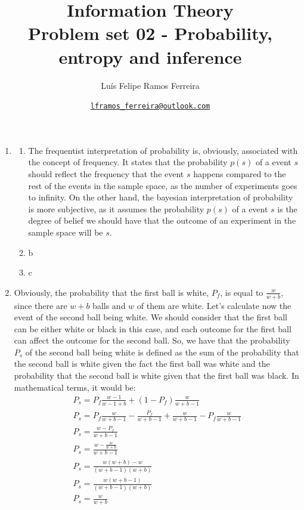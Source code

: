 \documentclass{article}
\title{Information Theory \\ \large Problem set 02 - Probability, entropy and inference}
\author{Luís Felipe Ramos Ferreira}
\date{\href{mailto:lframos\_ferreira@outlook.com}{\texttt{lframos\_ferreira@outlook.com}}
}
\begin{document}
\maketitle

\begin{enumerate}
    \item \begin{enumerate}
            \item The frequentist interpretation of probability is, obviously, associated with the concept of frequency. It states that the probability \(p(s)\) of a event \(s\) should reflect the frequency that the event \(s\) happens compared to the rest of the events in the sample space, as the number of experiments goes to infinity. On the other hand, the bayesian interpretation of probability is more subjective, as it assumes the probability \(p(s)\) of a event \(s\) is the degree of belief we should have that the outcome of an experiment in the sample space will be \(s\).
            \item b
            \item c
    \end{enumerate}

    \item Obviously, the probability that the first ball is white, \(P_f\), is equal to \(\frac{w}{w + b}\), since there are \(w + b\) balls and \(w\) of them are white. Let's calculate now the event of the second ball being white. We should consider that the first ball can be either white or black in this case, and each outcome for the first ball can affect the outcome for the second ball. So, we have that the probability \(P_s\) of the second ball being white is defined as the sum of the probability that the second ball is white given the fact the first ball was white and the probability that the second ball is white given that the first ball was black. In mathematical terms, it would be:
    \begin{gather}
        P_s = P_f\frac{w - 1}{w - 1 + b} + (1 - P_f)\frac{w}{w + b - 1} \\
        P_s = P_f\frac{w}{w + b - 1} - \frac{P_f}{w + b - 1} + \frac{w}{w + b - 1} - P_f\frac{w}{w + b - 1} \\
        P_s = \frac{w - P_f}{w + b - 1} \\
        P_s = \frac{w - \frac{w}{w + b}}{w + b - 1} \\
        P_s = \frac{w(w + b) - w}{(w + b - 1)(w + b)} \\
        P_s = \frac{w(w + b - 1)}{(w + b - 1)(w + b)} \\
        P_s = \frac{w}{w + b} 
    \end{gather}


\end{enumerate}
\end{document}
